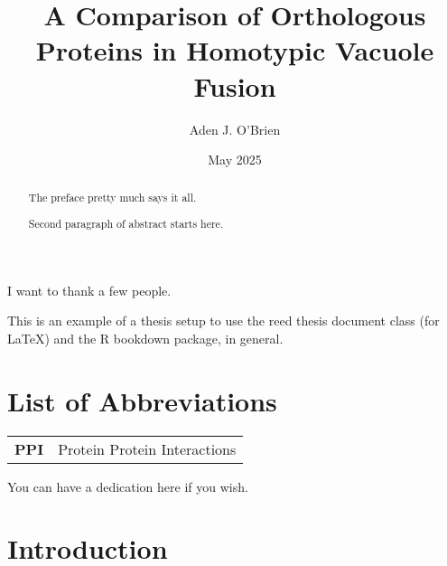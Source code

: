 \documentclass[12pt,twoside]{reedthesis}
\title{A Comparison of Orthologous Proteins in Homotypic Vacuole Fusion}
\author{Aden J. O'Brien}
\date{May 2025}
\begin{document}
  \maketitle

\frontmatter %
\pagestyle{empty} %

  \begin{acknowledgements}
    I want to thank a few people.
  \end{acknowledgements}

  \begin{preface}
    This is an example of a thesis setup to use the reed thesis document class
    (for LaTeX) and the R bookdown package, in general.
  \end{preface}

\chapter*{List of Abbreviations}
\begin{longtable}{p{} | p{}}
      \textbf{PPI} & Protein Protein Interactions \\
  \end{longtable}

  \hypersetup{linkcolor=black}
  \setcounter{secnumdepth}{2}
  \setcounter{tocdepth}{2}
  \tableofcontents

  \listoftables

  \listoffigures

  \begin{abstract}
    The preface pretty much says it all.

    \par

    Second paragraph of abstract starts here.
  \end{abstract}

  \begin{dedication}
    You can have a dedication here if you wish.
  \end{dedication}

\mainmatter %
\pagestyle{fancyplain} %

\chapter*{Introduction}\label{introduction}
\end{document}
